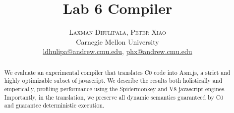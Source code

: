 \documentclass[twoside]{article}
\title{\vspace{-15mm}\fontsize{20pt}{10pt}\selectfont\textbf{Lab 6 Compiler}} %
\author{
\large
\textsc{Laxman Dhulipala, Peter Xiao}\\[2mm] %
\normalsize Carnegie Mellon University \\ %
\normalsize \href{mailto:ldhulipa@andrew.cmu.edu}{ldhulipa@andrew.cmu.edu}, \href{mailto:phx@andrew.cmu.edu}{phx@andrew.cmu.edu} %
\vspace{-5mm}
}
\date{}
\begin{document}
\maketitle %

\thispagestyle{fancy} %


\begin{abstract}

\noindent We evaluate an experimental compiler that translates C0 code into Asm.js, a strict 
and highly optimizable subset of javascript. We describe the results both holistically and emperically, 
profiling performance using the Spidermonkey and V8 javascript engines. Importantly, in the
translation, we preserve all dynamic semantics guaranteed by C0 and guarantee deterministic execution. 

\end{abstract}

\end{document}

